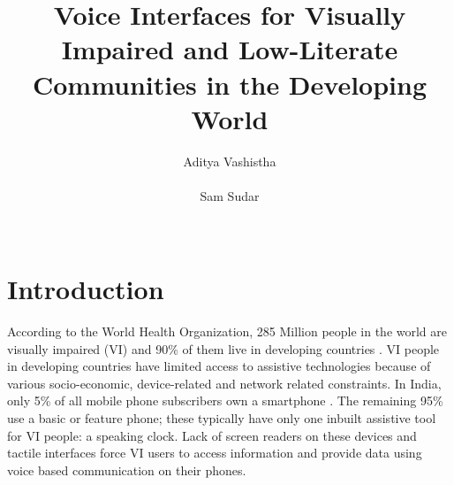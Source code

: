 \documentclass{sigchi}
\begin{document}
\title{Voice Interfaces for Visually Impaired and Low-Literate Communities in the Developing World}

\author{
  \alignauthor Aditya Vashistha\\
    \\
   \alignauthor Sam Sudar\\
    \\}

\maketitle

\section{Introduction}
According to the World Health Organization, 285 Million people in the world are visually impaired (VI) and 90\% of them live in developing countries \cite{WHO2013}. VI people in developing countries have limited access to assistive technologies because of various socio-economic, device-related and network related constraints. In India, only
5\% of all mobile phone subscribers own a smartphone \cite{Mary2013}. The remaining 95\% use a basic or feature phone; these typically have only one inbuilt assistive tool for VI people: a speaking clock. Lack of screen readers on these devices and tactile interfaces force VI users to access information and provide data using voice based communication on their phones. 
\end{document}
